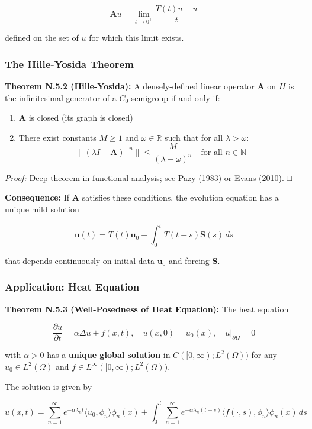 \documentclass[
]{article}
\providecommand{\tightlist}{%
  \setlength{\itemsep}{0pt}\setlength{\parskip}{0pt}}
\begin{document}
\[\mathbf{A}u = \lim_{t \to 0^+} \frac{T(t)u - u}{t}\]

defined on the set of \(u\) for which this limit exists.

\subsubsection{The Hille-Yosida Theorem}\label{the-hille-yosida-theorem}

\textbf{Theorem N.5.2 (Hille-Yosida):} A densely-defined linear operator
\(\mathbf{A}\) on \(H\) is the infinitesimal generator of a
\(C_0\)-semigroup if and only if:

\begin{enumerate}
\def\labelenumi{\arabic{enumi}.}
\tightlist
\item
  \(\mathbf{A}\) is closed (its graph is closed)
\item
  There exist constants \(M \geq 1\) and \(\omega \in \mathbb{R}\) such
  that for all \(\lambda > \omega\):
  \[\|(\lambda I - \mathbf{A})^{-n}\| \leq \frac{M}{(\lambda - \omega)^n} \quad \text{for all } n \in \mathbb{N}\]
\end{enumerate}

\emph{Proof:} Deep theorem in functional analysis; see Pazy (1983) or
Evans (2010). □

\textbf{Consequence:} If \(\mathbf{A}\) satisfies these conditions, the
evolution equation has a unique mild solution

\[\mathbf{u}(t) = T(t)\mathbf{u}_0 + \int_0^t T(t-s)\mathbf{S}(s)\,ds\]

that depends continuously on initial data \(\mathbf{u}_0\) and forcing
\(\mathbf{S}\).

\subsubsection{Application: Heat
Equation}\label{application-heat-equation}

\textbf{Theorem N.5.3 (Well-Posedness of Heat Equation):} The heat
equation

\[\frac{\partial u}{\partial t} = \alpha\Delta u + f(x,t), \quad u(x,0) = u_0(x), \quad u|_{\partial\Omega} = 0\]

with \(\alpha > 0\) has a \textbf{unique global solution} in
\(C([0,\infty); L^2(\Omega))\) for any \(u_0 \in L^2(\Omega)\) and
\(f \in L^\infty([0,\infty); L^2(\Omega))\).

The solution is given by

\[u(x,t) = \sum_{n=1}^\infty e^{-\alpha\lambda_n t} \langle u_0, \phi_n \rangle \phi_n(x) + \int_0^t \sum_{n=1}^\infty e^{-\alpha\lambda_n(t-s)} \langle f(\cdot,s), \phi_n \rangle \phi_n(x)\,ds\]
\end{document}

